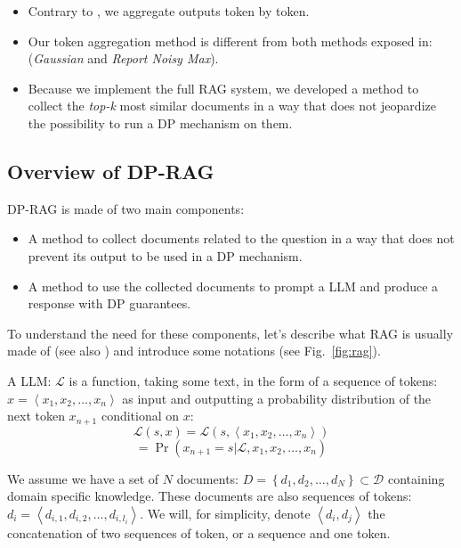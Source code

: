 \documentclass[conference]{IEEEtran}
\begin{document}
\begin{itemize}

\item
  Contrary to \cite{ref-wu2023privacypreservingincontextlearninglarge}, we aggregate outputs token by token.
\item
  Our token aggregation method is different from both methods exposed
  in: \cite{ref-tang2024privacypreservingincontextlearningdifferentially} (\emph{Gaussian} and \emph{Report Noisy Max}).
\item
  Because we implement the full RAG system, we developed a method to
  collect the \emph{top-k} most similar documents in a way that does not
  jeopardize the possibility to run a DP mechanism on them.
\end{itemize}

\subsection{Overview of DP-RAG}\label{overview-of-dp-rag}

DP-RAG is made of two main components:

\begin{itemize}

\item
  A method to collect documents related to the question in a way that
  does not prevent its output to be used in a DP mechanism.
\item
  A method to use the collected documents to prompt a LLM and produce a
  response with DP guarantees.
\end{itemize}

To understand the need for these components, let's describe what RAG is
usually made of (see also \cite{ref-lewis2021retrievalaugmentedgenerationknowledgeintensivenlp}) and introduce some
notations (see Fig.~\ref{fig:rag}).

A LLM: \(\mathcal{L}\) is a function, taking some text, in the form of a
sequence of tokens: \(x = \left<x_1, x_2, \ldots, x_n\right>\) as input
and outputting a probability distribution of the next token \(x_{n+1}\)
conditional on \(x\):
\[\mathcal{L}(s, x) = \mathcal{L}(s, \left<x_1, x_2, \ldots, x_n\right>)\]
\[= \Pr(x_{n+1} = s | \mathcal{L}, x_1, x_2, \ldots, x_n)\]

We assume we have a set of \(N\) documents:
\(D = \left\{d_1, d_2, \ldots, d_N\right\} \subset \mathcal{D}\)
containing domain specific knowledge. These documents are also sequences
of tokens: \(d_i = \left<d_{i,1}, d_{i,2}, \ldots, d_{i,l_i}\right>\).
We will, for simplicity, denote \(\left<d_i, d_j\right>\) the
concatenation of two sequences of token, or a sequence and one token.
\end{document}

